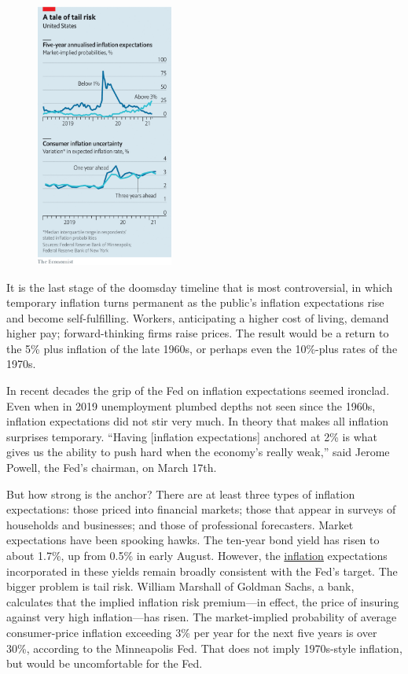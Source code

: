 \documentclass{article}
\begin{document}
\begin{figure}[h]
\centering
\includegraphics[width=0.4\textwidth]{images/20210327_fnc272.png}
\end{figure}


It is the last stage of the doomsday timeline that is most controversial, in which temporary inflation turns permanent as the public's inflation expectations rise and become self-fulfilling. Workers, anticipating a higher cost of living, demand higher pay; forward-thinking firms raise prices. The result would be a return to the 5\% plus inflation of the late 1960s, or perhaps even the 10\%-plus rates of the 1970s. 

In recent decades the grip of the Fed on inflation expectations seemed ironclad. Even when in 2019 unemployment plumbed depths not seen since the 1960s, inflation expectations did not stir very much. In theory that makes all inflation surprises temporary. ``Having {[}inflation expectations{]} anchored at 2\% is what gives us the ability to push hard when the economy's really weak,'' said Jerome Powell, the Fed's chairman, on March 17th. 

But how strong is the anchor? There are at least three types of inflation expectations: those priced into financial markets; those that appear in surveys of households and businesses; and those of professional forecasters. Market expectations have been spooking hawks. The ten-year bond yield has risen to about 1.7\%, up from 0.5\% in early August. However, the \href{/finance-and-economics/2021/03/27/the-fed-and-the-bond-markets}{inflation} expectations incorporated in these yields remain broadly consistent with the Fed's target. The bigger problem is tail risk. William Marshall of Goldman Sachs, a bank, calculates that the implied inflation risk premium---in effect, the price of insuring against very high inflation---has risen. The market-implied probability of average consumer-price inflation exceeding 3\% per year for the next five years is over 30\%, according to the Minneapolis Fed. That does not imply 1970s-style inflation, but would be uncomfortable for the Fed. 
\end{document}
